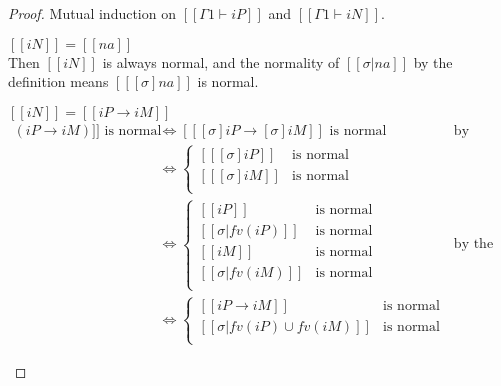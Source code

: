 \lemmaNormalAfterSubst*
\begin{proof}
  Mutual induction on $[[Γ1 ⊢ iP]]$ and $[[Γ1 ⊢ iN]]$.
  \begin{caseof}
  \item $[[iN]] = [[na]]$\\
    Then $[[iN]]$ is always normal, and
    the normality of $[[σ|{na}]]$ by the definition means $[[ [σ]na ]]$ is normal.

  \item $[[iN]] = [[iP → iM]]$ \label{case:normal-after-subst-arrow}
    \begin{align*}
      [[ [σ](iP → iM) ]] \text{ is normal} &\iff [[ [σ]iP → [σ]iM ]] \text{ is normal}
                                           && \text{by substitution
                                              congruence} \\
                                           &\iff
                                             \begin{cases}
                                             [[ [σ]iP ]] &\text{is normal} \\
                                             [[ [σ]iM ]] &\text{is normal} \\
                                             \end{cases}\\
                                           &\iff
                                             \begin{cases}
                                               [[ iP ]]       &\text{is normal} \\
                                               [[ σ|fv(iP) ]] &\text{is normal} \\
                                               [[ iM ]]       &\text{is normal} \\
                                               [[ σ|fv(iM) ]] &\text{is normal} \\
                                             \end{cases}
                                           && \text{by the induction hypothesis}\\
                                           &\iff
                                             \begin{cases}
                                               [[ iP → iM ]]  &\text{is normal} \\
                                               [[ σ|fv(iP) ∪ fv(iM)]] &\text{is normal} \\

\end{cases}
\end{align*}
\end{caseof}
\end{proof}
